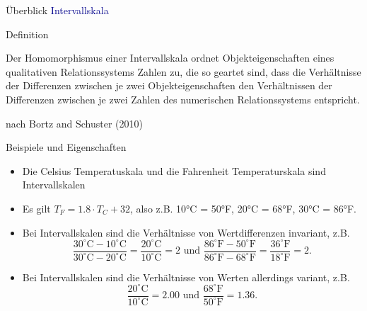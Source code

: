 \documentclass[
  8pt,
  ignorenonframetext,
]{beamer}
\providecommand{\tightlist}{%
  \setlength{\itemsep}{0pt}\setlength{\parskip}{0pt}}
\begin{document}
\begin{frame}{Überblick}
\protect\hypertarget{uxfcberblick-11}{}
\textcolor{darkblue}{Intervallskala}

Definition

\small

Der Homomorphismus einer Intervallskala ordnet Objekteigenschaften eines
qualitativen Relationssystems Zahlen zu, die so geartet sind, dass die
Verhältnisse der Differenzen zwischen je zwei Objekteigenschaften den
Verhältnissen der Differenzen zwischen je zwei Zahlen des numerischen
Relationssystems entspricht.

\footnotesize
\flushright

nach Bortz and Schuster (2010)

\justifying
\normalsize

Beispiele und Eigenschaften \footnotesize

\begin{itemize}
\tightlist
\item
  Die Celsius Temperatuskala und die Fahrenheit Temperaturskala sind
  Intervallskalen
\item
  Es gilt \(T_F = 1.8\cdot T_C + 32\), also z.B. 10°C = 50°F, 20°C =
  68°F, 30°C = 86°F.
\item
  Bei Intervallskalen sind die Verhältnisse von Wertdifferenzen
  invariant, z.B. \begin{equation}
  \frac{30^{\circ}\mbox{C} - 10^{\circ}\mbox{C}}{30^{\circ}\mbox{C} - 20^{\circ}\mbox{C}} = \frac{20^{\circ}\mbox{C}}{10^{\circ}\mbox{C}} = 2 \mbox{ und }
  \frac{86^{\circ}\mbox{F} - 50^{\circ}\mbox{F}}{86^{\circ}\mbox{F} - 68^{\circ}\mbox{F}} = \frac{36^{\circ}\mbox{F}}{18^{\circ}\mbox{F}} = 2.
  \end{equation}
\item
  Bei Intervallskalen sind die Verhältnisse von Werten allerdings
  variant, z.B. \begin{equation}
  \frac{20^{\circ}\mbox{C}}{10^{\circ}\mbox{C}} = 2.00 \mbox{ und }
  \frac{68^{\circ}\mbox{F}}{50^{\circ}\mbox{F}} = 1.36.
  \end{equation}
\end{itemize}
\end{frame}
\end{document}
